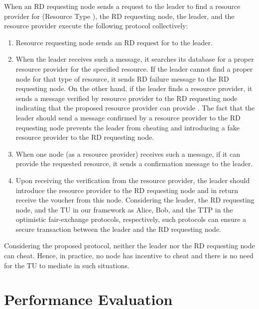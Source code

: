 \documentclass[journal,12pt, onecolumn]{IEEEtran}
\begin{document}
When an RD requesting node sends a request to the leader to find a resource provider for  (Resource Type ), the RD requesting node, the leader, and the resource provider execute the following protocol collectively: 
\begin{enumerate} 
\item Resource requesting node sends an RD request for  to the leader. 
\item When the leader receives such a message, it searches its database for a proper resource provider for the specified resource. If the leader cannot find a proper node for that type of resource, it sends RD failure message to the RD requesting node. On the other hand, if the leader finds a resource provider, it sends a message verified by resource provider to the RD requesting node indicating that the proposed resource provider can provide . The fact that the leader should send a message confirmed by a resource provider to the RD requesting node prevents the leader from cheating and introducing a fake resource provider to the RD requesting node.

\item When one node (as a resource provider) receives such a message, if it can provide the requested resource, it sends a confirmation message to the leader.
\item Upon receiving the verification from the resource provider, the leader should introduce the resource provider to the RD requesting node and in return receive the voucher from this node. Considering the leader, the RD requesting node, and the TU in our framework as Alice, Bob, and the TTP in the optimistic fair-exchange protocols, respectively, such protocols can ensure a secure transaction between the leader and the RD requesting node. 

\end{enumerate}

Considering the proposed protocol, neither the leader nor the RD requesting node can cheat. Hence, in practice, no node has incentive to cheat and there is no need for the TU to mediate in such situations.


\section{Performance Evaluation} 
\end{document}
